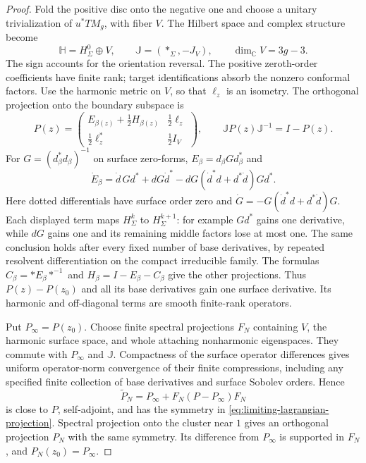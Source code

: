 \documentclass[11pt]{amsart}
\theoremstyle{definition}
\theoremstyle{remark}
\theoremstyle{plain}
\newcommand{\CC}{\mathbb{C}}
\begin{document}
\begin{proof}
Fold the positive disc onto the negative one and choose a unitary
trivialization of $u^*TM_g$, with fiber $V$. The Hilbert space and
complex structure become
\[
 \mathbb H=H^0_\Sigma\oplus V,\qquad
 \mathbb J=(*_\Sigma,-J_V),\qquad \dim_\CC V=3g-3.
\]
The sign accounts for the orientation reversal. The positive
zeroth-order coefficients have finite rank; target identifications
absorb the nonzero conformal factors. Use the harmonic metric on
$V$, so that $\ell_z$ is an isometry. The orthogonal projection
onto the boundary subspace is
\begin{equation}\label{eq:limiting-lagrangian-projection}
 P(z)=\begin{pmatrix}
 E_{\beta(z)}+\tfrac12H_{\beta(z)}&\tfrac12\ell_z\\
 \tfrac12\ell_z^*&\tfrac12I_V
 \end{pmatrix},\qquad
 \mathbb JP(z)\mathbb J^{-1}=I-P(z).
\end{equation}
For $G=(d_\beta^*d_\beta)^{-1}$ on surface zero-forms,
$E_\beta=d_\beta Gd_\beta^*$ and
\begin{equation}\label{eq:hodge-projection-derivative}
 \dot E_\beta=\dot d\,Gd^*+dG\dot d^*
                      -dG(\dot d^*d+d^*\dot d)Gd^*.
\end{equation}
Here dotted differentials have surface order zero and
$\dot G=-G(\dot d^*d+d^*\dot d)G$. Each displayed term
maps $H^k_\Sigma$ to $H^{k+1}_\Sigma$: for example
$Gd^*$ gains one derivative, while $dG$ gains one and its
remaining middle factors lose at most one. The same conclusion
holds after every fixed number of base derivatives, by repeated
resolvent differentiation on the compact irreducible family.
The formulas $C_\beta=*E_\beta*^{-1}$ and
$H_\beta=I-E_\beta-C_\beta$ give the other projections.
Thus $P(z)-P(z_0)$ and all its base derivatives gain one
surface derivative. Its harmonic and off-diagonal terms are
smooth finite-rank operators.

Put $P_\infty=P(z_0)$. Choose finite spectral projections $F_N$
containing $V$, the harmonic surface space, and whole attaching
nonharmonic eigenspaces. They commute with $P_\infty$ and
$\mathbb J$. Compactness of the surface operator differences gives
uniform operator-norm convergence of their finite compressions,
including any specified finite collection of base derivatives and
surface Sobolev orders. Hence
\[
 \widetilde P_N=P_\infty+F_N(P-P_\infty)F_N
\]
is close to $P$, self-adjoint, and has the symmetry in
\eqref{eq:limiting-lagrangian-projection}. Spectral projection onto
the cluster near $1$ gives an orthogonal projection $P_N$ with
the same symmetry. Its difference from $P_\infty$ is supported
in $F_N$, and $P_N(z_0)=P_\infty$.


\end{proof}
\end{document}

